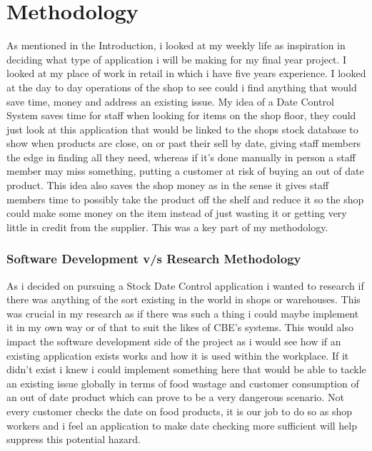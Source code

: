 \chapter{Methodology}
As mentioned in the Introduction, i looked at my weekly life as inspiration in deciding what type of application i will be making for my final year project. I looked at my place of work in retail in which i have five years experience. I looked at the day to day operations of the shop to see could i find anything that would save time, money and address an existing issue. My idea of a Date Control System saves time for staff when looking for items on the shop floor, they could just look at this application that would be linked to the shops stock database to show when products are close, on or past their sell by date, giving staff members the edge in finding all they need, whereas if it's done manually in person a staff member may miss something, putting a customer at risk of buying an out of date product. This idea also saves the shop money as in the sense it gives staff members time to possibly take the product off the shelf and reduce it so the shop could make some money on the item instead of just wasting it or getting very little in credit from the supplier. This was a key part of my methodology.
\newline

\subsection{Software Development v/s Research Methodology}
As i decided on pursuing a Stock Date Control application i wanted to research if there was anything of the sort existing in the world in shops or warehouses. This was crucial in my research as if there was such a thing i could maybe implement it in my own way or of that to suit the likes of CBE's systems. This would also impact the software development side of the project as i would see how if an existing application exists works and how it is used within the workplace. If it didn't exist i knew i could implement something here that would be able to tackle an existing issue globally in terms of food wastage and customer consumption of an out of date product which can prove to be a very dangerous scenario. Not every customer checks the date on food products, it is our job to do so as shop workers and i feel an application to make date checking more sufficient will help suppress this potential hazard.  
\newline

